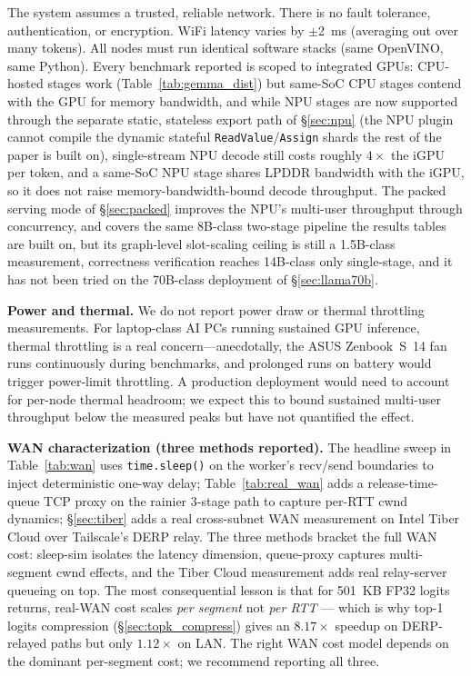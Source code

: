 \documentclass[11pt]{article}
\begin{document}
The system assumes a trusted, reliable network. There is no fault tolerance, authentication, or encryption. WiFi latency varies by $\pm$2~ms (averaging out over many tokens). All nodes must run identical software stacks (same OpenVINO, same Python). Every benchmark reported is scoped to integrated GPUs: CPU-hosted stages work (Table~\ref{tab:gemma_dist}) but same-SoC CPU stages contend with the GPU for memory bandwidth, and while NPU stages are now supported through the separate static, stateless export path of \S\ref{sec:npu} (the NPU plugin cannot compile the dynamic stateful \texttt{ReadValue}/\texttt{Assign} shards the rest of the paper is built on), single-stream NPU decode still costs roughly $4\times$ the iGPU per token, and a same-SoC NPU stage shares LPDDR bandwidth with the iGPU, so it does not raise memory-bandwidth-bound decode throughput. The packed serving mode of \S\ref{sec:packed} improves the NPU's multi-user throughput through concurrency, and covers the same 8B-class two-stage pipeline the results tables are built on, but its graph-level slot-scaling ceiling is still a 1.5B-class measurement, correctness verification reaches 14B-class only single-stage, and it has not been tried on the 70B-class deployment of \S\ref{sec:llama70b}.

\textbf{Power and thermal.} We do not report power draw or thermal throttling measurements. For laptop-class AI PCs running sustained GPU inference, thermal throttling is a real concern---anecdotally, the ASUS Zenbook~S~14 fan runs continuously during benchmarks, and prolonged runs on battery would trigger power-limit throttling. A production deployment would need to account for per-node thermal headroom; we expect this to bound sustained multi-user throughput below the measured peaks but have not quantified the effect.

\textbf{WAN characterization (three methods reported).} The headline sweep in Table~\ref{tab:wan} uses \texttt{time.sleep()} on the worker's recv/send boundaries to inject deterministic one-way delay; Table~\ref{tab:real_wan} adds a release-time-queue TCP proxy on the rainier 3-stage path to capture per-RTT cwnd dynamics; \S\ref{sec:tiber} adds a real cross-subnet WAN measurement on Intel Tiber Cloud over Tailscale's DERP relay. The three methods bracket the full WAN cost: sleep-sim isolates the latency dimension, queue-proxy captures multi-segment cwnd effects, and the Tiber Cloud measurement adds real relay-server queueing on top. The most consequential lesson is that for 501~KB FP32 logits returns, real-WAN cost scales \emph{per segment} not \emph{per RTT} --- which is why top-1 logits compression (\S\ref{sec:topk_compress}) gives an $8.17\times$ speedup on DERP-relayed paths but only $1.12\times$ on LAN. The right WAN cost model depends on the dominant per-segment cost; we recommend reporting all three.
\end{document}
